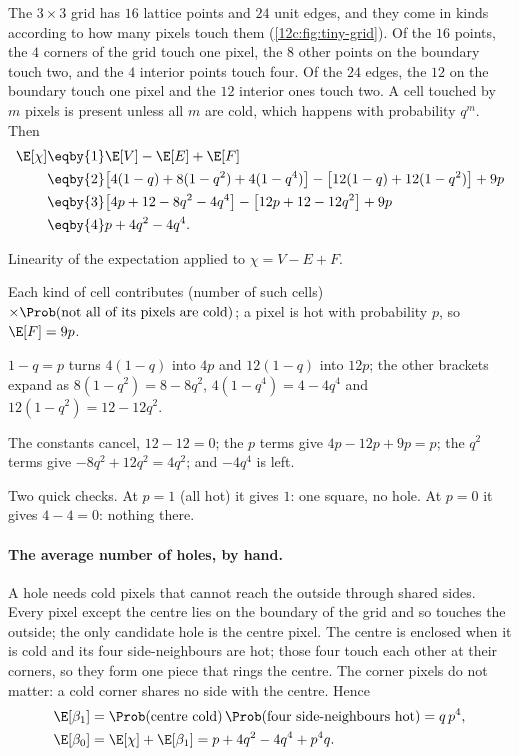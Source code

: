 The $3\times3$ grid has $16$ lattice points and $24$ unit edges, and they come in kinds according to how many pixels
touch them (\cref{12c:fig:tiny-grid}). Of the $16$ points, the $4$ corners of the grid touch one pixel, the $8$ other
points on the boundary touch two, and the $4$ interior points touch four. Of the $24$ edges, the $12$ on the boundary
touch one pixel and the $12$ interior ones touch two. A cell touched by $m$ pixels is present unless all $m$ are cold,
which happens with probability $q^m$. Then
\begin{align}
  \E[\chi]
  &\eqby{1}\E[V]-\E[E]+\E[F]\nonumber\\
  &\eqby{2}\bigl[4(1-q)+8(1-q^2)+4(1-q^4)\bigr]-\bigl[12(1-q)+12(1-q^2)\bigr]+9p\nonumber\\
  &\eqby{3}\bigl[4p+12-8q^2-4q^4\bigr]-\bigl[12p+12-12q^2\bigr]+9p\nonumber\\
  &\eqby{4}p+4q^2-4q^4 .
  \label{12c:eq:tiny-chi}
\end{align}
\begin{explain}
  \item Linearity of the expectation applied to $\chi=V-E+F$.
  \item Each kind of cell contributes (number of such cells)$\times\Prob(\text{not all of its pixels are cold})$; a
        pixel is hot with probability $p$, so $\E[F]=9p$.
  \item $1-q=p$ turns $4(1-q)$ into $4p$ and $12(1-q)$ into $12p$; the other brackets expand as $8(1-q^2)=8-8q^2$,
        $4(1-q^4)=4-4q^4$ and $12(1-q^2)=12-12q^2$.
  \item The constants cancel, $12-12=0$; the $p$ terms give $4p-12p+9p=p$; the $q^2$ terms give $-8q^2+12q^2=4q^2$; and
        $-4q^4$ is left.
\end{explain}
Two quick checks. At $p=1$ (all hot) it gives $1$: one square, no hole. At $p=0$ it gives $4-4=0$: nothing there.

\paragraph{The average number of holes, by hand.}
A hole needs cold pixels that cannot reach the outside through shared sides. Every pixel except the centre lies on the
boundary of the grid and so touches the outside; the only candidate hole is the centre pixel. The centre is enclosed
when it is cold and its four side-neighbours are hot; those four touch each other at their corners, so they form one
piece that rings the centre. The corner pixels do not matter: a cold corner shares no side with the centre. Hence
\begin{align}
  \E[\beta_1]&=\Prob(\text{centre cold})\,\Prob(\text{four side-neighbours hot})=q\,p^4 ,\nonumber\\
  \E[\beta_0]&=\E[\chi]+\E[\beta_1]=p+4q^2-4q^4+p^4q .
  \label{12c:eq:tiny-b}
\end{align}

